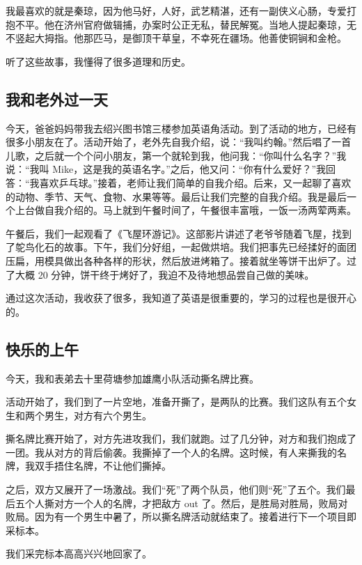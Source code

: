 \documentclass[UTF8,a4paper,titlepage,twoside,10.5pt]{article}
\begin{document}
我最喜欢的就是秦琼，因为他马好，人好，武艺精湛，还有一副侠义心肠，专爱打抱不平。他在济州官府做辑捕，办案时公正无私，替民解冤。当地人提起秦琼，无不竖起大拇指。他那匹马，是御顶干草皇，不幸死在疆场。他善使铜锏和金枪。

听了这些故事，我懂得了很多道理和历史。

\subsection{我和老外过一天}
\label{sec:orge9dfcb4}

今天，爸爸妈妈带我去绍兴图书馆三楼参加英语角活动。到了活动的地方，已经有很多小朋友在了。活动开始了，老外先自我介绍，说：“我叫约翰。”然后唱了一首儿歌，之后就一个个问小朋友，第一个就轮到我，他问我：“你叫什么名字？”我说：“我叫 Mike，这是我的英语名字。”之后，他又问：“你有什么爱好？”我回答：“我喜欢乒乓球。”接着，老师让我们简单的自我介绍。后来，又一起聊了喜欢的动物、季节、天气、食物、水果等等。最后让我们完整的自我介绍。我是最后一个上台做自我介绍的。马上就到午餐时间了，午餐很丰富哦，一饭一汤两荤两素。

午餐后，我们一起观看了《飞屋环游记》。这部影片讲述了老爷爷随着飞屋，找到了鸵鸟化石的故事。下午，我们分好组，一起做烘培。我们把事先已经揉好的面团压扁，用模具做出各种各样的形状，然后放进烤箱了。接着就坐等饼干出炉了。过了大概 20 分钟，饼干终于烤好了，我迫不及待地想品尝自己做的美味。

通过这次活动，我收获了很多，我知道了英语是很重要的，学习的过程也是很开心的。

\subsection{快乐的上午}
\label{sec:org4e73cf0}

今天，我和表弟去十里荷塘参加雄鹰小队活动撕名牌比赛。

活动开始了，我们到了一片空地，准备开撕了，是两队的比赛。我们这队有五个女生和两个男生，对方有六个男生。

撕名牌比赛开始了，对方先进攻我们，我们就跑。过了几分钟，对方和我们抱成了一团。我从对方的背后偷袭。我撕掉了一个人的名牌。这时候，有人来撕我的名牌，我双手捂住名牌，不让他们撕掉。

之后，双方又展开了一场激战。我们“死”了两个队员，他们则“死”了五个。我们最后五个人撕对方一个人的名牌，才把敌方 out 了。然后，是胜局对胜局，败局对败局。因为有一个男生中暑了，所以撕名牌活动就结束了。接着进行下一个项目即采标本。

我们采完标本高高兴兴地回家了。
\end{document}
